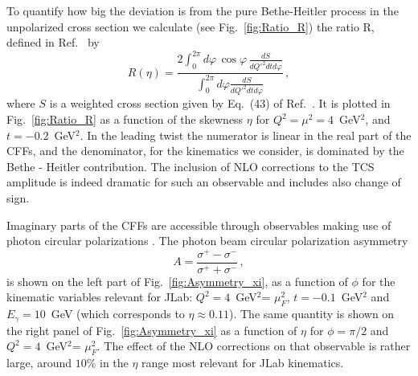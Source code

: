 
To quantify how big the deviation is from the pure Bethe-Heitler process in
the unpolarized cross section we calculate (see Fig.~\ref{fig:Ratio_R}) the
ratio R, defined in Ref.~\cite{Berger:2001xd} by
\begin{equation}
R(\eta) =  \frac{2\int_0^{2 \pi} d \varphi \,\cos \varphi\, \frac{dS}{dQ'^2dtd\varphi}}{\int_0^{2 \pi} d \varphi\frac{dS}{dQ'^2dtd\varphi}}
\,,
\label{eq:R_ratio}
\end{equation}
where $S$ is a weighted cross section given by Eq.~(43) of
Ref.~\cite{Berger:2001xd}.
It is plotted in Fig.~\ref{fig:Ratio_R} as a function of the skewness $\eta$
for $Q^2 = \mu^2 = 4$~GeV$^2$, and $t= -0.2$~GeV$^2$. In the leading twist the
numerator is linear in the real part of the CFFs, and the denominator, for the
kinematics we consider, is dominated by the Bethe - Heitler contribution. The
inclusion of NLO corrections to the TCS amplitude is indeed dramatic for such
an observable and includes also change of sign.




Imaginary parts of the CFFs are accessible through observables making use of
photon circular polarizations \cite{Berger:2001xd}. The photon beam circular
polarization asymmetry
\begin{equation}
A= \frac{\sigma^+ - \sigma^-}{\sigma^+ + \sigma^-}\,,
\end{equation}
is shown on the left part of Fig.~\ref{fig:Asymmetry_xi}, as a function of
$\phi$ for the kinematic variables relevant for JLab:
$Q^2 =4$~GeV$^2$= $\mu_F^2$, $t=-0.1$~GeV$^2$ and $E_\gamma = 10$~GeV (which
corresponds to $\eta \approx 0.11$). The same quantity is shown on the right
panel of Fig.~\ref{fig:Asymmetry_xi} as a function of $\eta$ for
$\phi = \pi/2$ and $Q^2 =4$~GeV$^2$= $\mu_F^2$. The effect of the NLO
corrections on that observable is rather large, around $10\%$ in the $\eta$
range most relevant for JLab kinematics.

